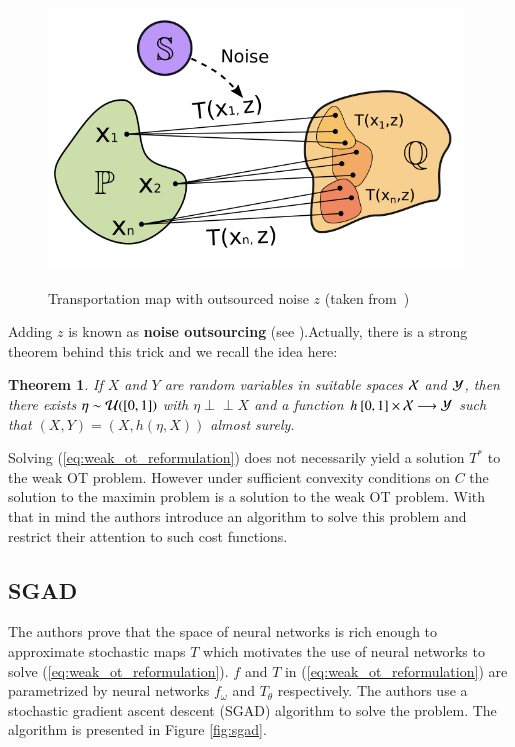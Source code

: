 \documentclass[11pt]{article}
\newtheorem{theorem}{Theorem}
\newcommand{\indep}{\perp \!\!\! \perp}
\begin{document}
\begin{figure}
\centering
\includegraphics[width=0.9\linewidth]{figures/transportation-plan.png}
\label{transportation-map}
\caption{Transportation map with outsourced noise $z$ (taken from~\cite{korotin-2022})}
\end{figure}

Adding $z$ is known as \textbf{noise outsourcing} (see \cite{kallenberg2002foundations}).Actually, there is a strong theorem behind this trick and we recall the idea here:

\begin{theorem}
    If $X$ and $Y$ are random variables in suitable spaces ${\cal X}$ and ${\cal Y}$, then there exists $\eta\sim {\cal U}([0,1])$ with $\eta \indep X$ and a function $h\: [0, 1]\times {\cal X} \longrightarrow {\cal Y}$ such that $(X, Y) = (X, h(\eta, X))$ almost surely.
\end{theorem}

Solving (\ref{eq:weak_ot_reformulation}) does not necessarily yield a solution $T^*$ to the weak OT problem. However under sufficient convexity conditions on $C$ the solution to the maximin problem is a solution to the weak OT problem. With that in mind the authors introduce an algorithm to solve this problem and restrict their attention to such cost functions.

\subsection{SGAD}

The authors prove that the space of neural networks is rich enough to approximate stochastic maps $T$ which motivates the use of neural networks to solve (\ref{eq:weak_ot_reformulation}). $f$ and $T$ in (\ref{eq:weak_ot_reformulation}) are parametrized by neural networks $f_{\omega}$ and $T_{\theta}$ respectively. The authors use a stochastic gradient ascent descent (SGAD) algorithm to solve the problem. The algorithm is presented in Figure \ref{fig:sgad}.
\end{document}
